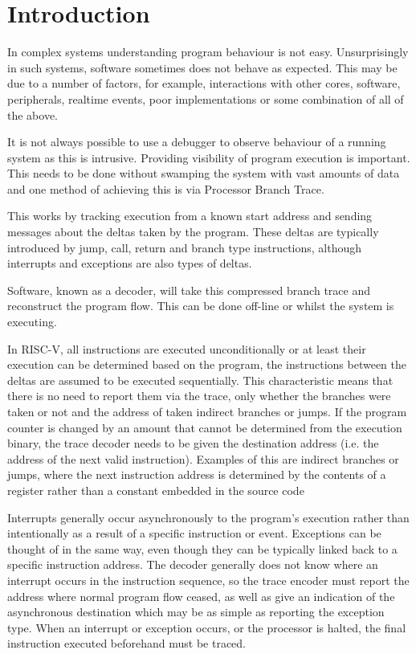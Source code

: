 \chapter{Introduction}
\label{sec:intro}

In complex systems understanding program behaviour is not easy.
Unsurprisingly in such systems, software sometimes does not behave as
expected. This may be due to a number of factors, for example,
interactions with other cores, software, peripherals, realtime
events, poor implementations or some combination of all of the above.

It is not always possible to use a debugger to observe behaviour of a
running system as this is intrusive.  Providing visibility of program
execution is important.  This needs to be done without swamping the
system with vast amounts of data and one method of achieving this is
via Processor Branch Trace.

This works by tracking execution from a known start address and sending
messages about the deltas taken by the program. These deltas are typically
introduced by jump, call, return and branch type instructions,
although interrupts and exceptions are also types of deltas.

Software, known as a decoder, will take this compressed branch trace
and reconstruct the program flow. This can be done off-line or
whilst the system is executing.

In RISC-V, all instructions are executed unconditionally or at least
their execution can be determined based on the program, the
instructions between the deltas are assumed to be executed
sequentially.  This characteristic means that there is no need to
report them via the trace, only whether the branches were taken or not
and the address of taken indirect branches or jumps. If the program
counter is changed by an amount that cannot be determined from the
execution binary, the trace decoder needs to be given the destination
address (i.e. the address of the next valid instruction).  Examples of
this are indirect branches or jumps, where the next instruction
address is determined by the contents of a register rather than a
constant embedded in the source code

Interrupts generally occur asynchronously to the program's execution
rather than intentionally as a result of a specific instruction or
event.  Exceptions can be thought of in the same way, even though they
can be typically linked back to a specific instruction address.  The
decoder generally does not know where an interrupt occurs in the
instruction sequence, so the trace encoder must report the address
where normal program flow ceased, as well as give an indication of the
asynchronous destination which may be as simple as reporting the
exception type.  When an interrupt or exception occurs, or the
processor is halted, the final instruction executed beforehand must be
traced.


